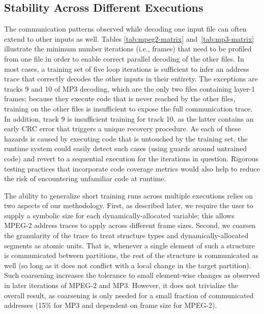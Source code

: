 
\subsection*{Stability Across Different Executions}

The communication patterns observed while decoding one input file can
often extend to other inputs as well.  Tables \ref{tab:mpeg2-matrix}
and~\ref{tab:mp3-matrix} illustrate the minimum number iterations
(i.e., frames) that need to be profiled from one file in order to
enable correct parallel decoding of the other files.  In most cases, a
training set of five loop iterations is sufficient to infer an address
trace that correctly decodes the other inputs in their entirety.  The
exceptions are tracks 9 and 10 of MP3 decoding, which are the only two
files containing layer-1 frames; because they execute code that is
never reached by the other files, training on the other files is
insufficient to expose the full communication trace.  In addition,
track 9 is insufficient training for track 10, as the latter contains
an early CRC error that triggers a unique recovery procedure.  As each
of these hazards is caused by executing code that is untouched by the
training set, the runtime system could easily detect such cases (using
guards around untrained code) and revert to a sequential execution for
the iterations in question.  Rigorous testing practices that
incorporate code coverage metrics would also help to reduce the risk
of encountering unfamiliar code at runtime.

The ability to generalize short training runs across multiple
executions relies on two aspects of our methodology.  First, as
described later, we require the user to supply a symbolic size for
each dynamically-allocated variable; this allows MPEG-2 address traces
to apply across different frame sizes.  Second, we coarsen the
granularity of the trace to treat structure types and
dynamically-allocated segments as atomic units.  That is, whenever a
single element of such a structure is communicated between partitions,
the rest of the structure is communicated as well (so long as it does
not conflict with a local change in the target partition).  Such
coarsening increases the tolerance to small element-wise changes as
observed in later iterations of MPEG-2 and MP3.  However, it does not
trivialize the overall result, as coarsening is only needed for a
small fraction of communicated addresses (15\% for MP3 and dependent
on frame size for MPEG-2).

